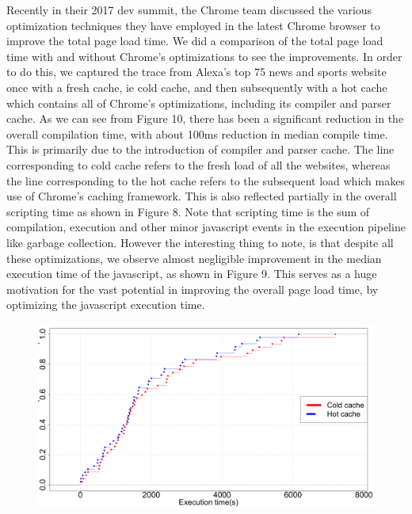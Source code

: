 Recently in their 2017 dev summit, the Chrome team discussed the various optimization techniques
they have employed in the latest Chrome browser to improve the total page load time.
We did a comparison of the total page load time with and without Chrome's optimizations to see
the improvements. In order to do this, we captured the trace from Alexa's top 75 
news and sports website once with a fresh cache, ie cold cache, and then subsequently with a hot
cache which contains all of Chrome's optimizations, including its compiler and parser cache. 
As we can see from Figure 10, there has been a significant reduction in the overall compilation
time, with about 100ms reduction in median compile time. This is primarily due to the introduction of compiler and parser cache. 
The line corresponding to cold cache refers to the fresh load of all the websites,
whereas the line corresponding to the hot cache refers to the subsequent load
which makes use of Chrome's caching framework. 
This is also reflected partially in the overall scripting time
as shown in Figure 8. Note that scripting time is the sum of compilation, execution and other
minor javascript events in the execution pipeline like garbage collection. 
However the interesting thing to note, is that despite all these optimizations,
we observe almost negligible improvement in the median execution time of the javascript, as
shown in Figure 9. This serves as a huge motivation for the vast potential in
improving the overall page load time, by optimizing the javascript execution
time.

\begin{figure}[t]
\centering
\includegraphics[width=0.9\columnwidth]{figs/chrome_exec.png}
\label{fig:compile_p2}
\end{figure}

